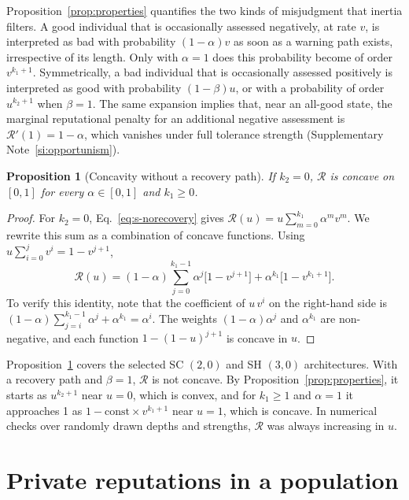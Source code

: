 \documentclass[10pt]{wlscirep}
\newcommand{\Rmap}{\mathscr{R}}            %
\theoremstyle{plain}
\newtheorem{proposition}[lemma]{Proposition}
\theoremstyle{remark}
\begin{document}
Proposition~\ref{prop:properties} quantifies the two kinds of misjudgment that inertia filters. A good individual that is occasionally assessed negatively, at rate $v$, is interpreted as bad with probability $(1-\alpha)v$ as soon as a warning path exists, irrespective of its length. Only with $\alpha=1$ does this probability become of order $v^{k_1+1}$. Symmetrically, a bad individual that is occasionally assessed positively is interpreted as good with probability $(1-\beta)u$, or with a probability of order $u^{k_2+1}$ when $\beta=1$. The same expansion implies that, near an all-good state, the marginal reputational penalty for an additional negative assessment is $\Rmap'(1)=1-\alpha$, which vanishes under full tolerance strength (Supplementary Note~\ref{si:opportunism}).

\begin{proposition}[Concavity without a recovery path]\label{prop:concave}
If $k_2=0$, $\Rmap$ is concave on $[0,1]$ for every $\alpha\in[0,1]$ and $k_1\geq0$.
\end{proposition}
\begin{proof}
For $k_2=0$, Eq.~\eqref{eq:s-norecovery} gives $\Rmap(u)=u\sum_{m=0}^{k_1}\alpha^mv^m$. We rewrite this sum as a combination of concave functions. Using $u\sum_{i=0}^{j}v^i=1-v^{j+1}$,
\begin{equation}
\Rmap(u)=(1-\alpha)\sum_{j=0}^{k_1-1}\alpha^j\bigl[1-v^{j+1}\bigr]+\alpha^{k_1}\bigl[1-v^{k_1+1}\bigr].
\label{eq:s-concave}
\end{equation}
To verify this identity, note that the coefficient of $u\,v^i$ on the right-hand side is $(1-\alpha)\sum_{j=i}^{k_1-1}\alpha^j+\alpha^{k_1}=\alpha^i$. The weights $(1-\alpha)\alpha^j$ and $\alpha^{k_1}$ are non-negative, and each function $1-(1-u)^{j+1}$ is concave in $u$.
\end{proof}

Proposition~\ref{prop:concave} covers the selected SC $(2,0)$ and SH $(3,0)$ architectures. With a recovery path and $\beta=1$, $\Rmap$ is not concave. By Proposition~\ref{prop:properties}, it starts as $u^{k_2+1}$ near $u=0$, which is convex, and for $k_1\geq1$ and $\alpha=1$ it approaches 1 as $1-\mathrm{const}\times v^{k_1+1}$ near $u=1$, which is concave. In numerical checks over randomly drawn depths and strengths, $\Rmap$ was always increasing in $u$.

\FloatBarrier
\section{Private reputations in a population}
\label{si:population}
\end{document}
